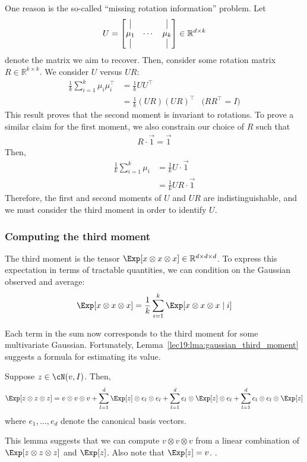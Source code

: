 One reason is the so-called ``missing rotation information'' problem. Let 
\begin{equation}
    U =\begin{bmatrix} \vrule & & \vrule \\ \mu_1 & \cdots & \mu_k \\ \vrule & & \vrule \end{bmatrix} \in\mathbb{R}^{d\times k}
\end{equation}
denote the matrix we aim to recover. Then, consider some rotation matrix $R\in\mathbb{R}^{k\times k}$. We consider $U$ versus $U R$:
\begin{align}
    \frac{1}{k}\sum_{i=1}^k\mu_i\mu_i^\top &= \frac{1}{k}U U^\top \\
    &=\frac{1}{k}(U R)(U R)^\top &\text{($RR^\top=I$)}
\end{align}
This result proves that the second moment is invariant to rotations. To prove a similar claim for the first moment, we also constrain our choice of $R$ such that
\begin{align}
    R\cdot\Vec{1}=\Vec{1}
\end{align}
Then,
\begin{align}
    \frac{1}{k}\sum_{i=1}^k\mu_i&=\frac{1}{k} U \cdot\Vec{1} \\
    &=\frac{1}{k} U R\cdot\Vec{1}
\end{align}
Therefore, the first and second moments of $U$ and $U R$ are indistinguishable, and we must consider the third moment in order to identify $U$.

\subsubsection{Computing the third moment}

The third moment is the tensor $\Exp[x \otimes x \otimes x] \in \mathbb{R}^{d \times d \times d}$. To express this expectation in terms of tractable quantities, we can condition on the Gaussian observed and average:
\begin{align}
	\Exp[x \otimes x \otimes x] = \frac{1}{k} \sum_{i=1}^k \Exp[x \otimes x \otimes x \mid i]
\end{align}

Each term in the sum now corresponds to the third moment for some multivariate Gaussian. Fortunately, Lemma~\ref{lec19:lma:gaussian_third_moment} suggests a formula for estimating its value.
\begin{lemma} \label{lec19:lma:gaussian_third_moment}
Suppose $z \in \cN(v, I)$. Then, 
\begin{align}
	\Exp[z \otimes z \otimes z] = v \otimes v \otimes v +  \sum_{l=1}^d \Exp[z] \otimes e_l \otimes e_l + \sum_{l=1}^d  e_l \otimes \Exp[z] \otimes e_l + \sum_{l=1}^d  e_l \otimes e_l \otimes \Exp[z] 
\end{align}
where $e_1,\dots,e_d$ denote the canonical basis vectors.
\end{lemma}
This lemma suggests that we can compute $v \otimes v \otimes v$ from a linear combination of $\Exp[z \otimes z \otimes z]$  and $\Exp[z]$. Also note that $\Exp[z] = v$. . 

